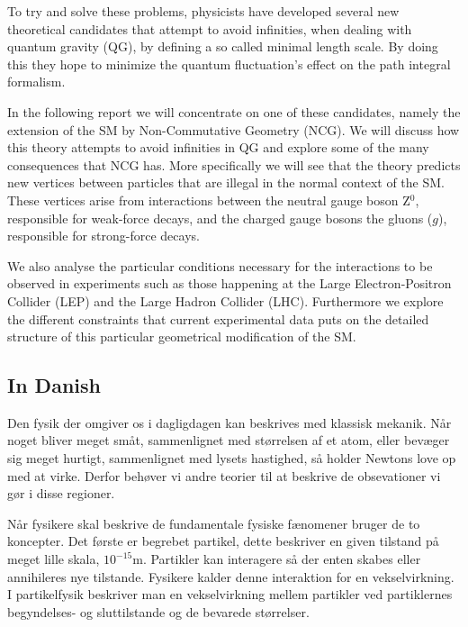 To try and solve these problems, physicists have developed several new theoretical candidates that attempt to avoid infinities, when dealing with quantum gravity (QG), by defining a so called minimal length scale. By doing this they hope to minimize the quantum fluctuation's effect on the path integral formalism.

In the following report we will concentrate on one of these candidates, namely the extension of the SM by Non-Commutative Geometry (NCG). We will discuss how this theory attempts to avoid infinities in QG and explore some of the many consequences that NCG has. More specifically we will see that the theory predicts new vertices between particles that are illegal in the normal context of the SM. These vertices arise from interactions between the neutral gauge boson Z$^0$, responsible for weak-force decays, and the charged gauge bosons the gluons ($g$), responsible for strong-force decays.

We also analyse the particular conditions necessary for the interactions to be observed in experiments such as those happening at the Large Electron-Positron Collider (LEP) and the Large Hadron Collider (LHC). Furthermore we explore the different constraints that current experimental data puts on the detailed structure of this particular geometrical modification of the SM.

\newpage
\subsection{In Danish}
Den fysik der omgiver os i dagligdagen kan beskrives med klassisk mekanik. Når noget bliver meget småt, sammenlignet med størrelsen af et atom, eller bevæger sig meget hurtigt, sammenlignet med lysets hastighed, så holder Newtons love op med at virke. Derfor behøver vi andre teorier til at beskrive de obsevationer vi gør i disse regioner.

Når fysikere skal beskrive de fundamentale fysiske fænomener bruger de to koncepter. Det første er begrebet partikel, dette beskriver en given tilstand på meget lille skala, $10^{-15}$m. Partikler kan interagere så der enten skabes eller annihileres nye tilstande. Fysikere kalder denne interaktion for en vekselvirkning. I partikelfysik beskriver man en vekselvirkning mellem partikler ved partiklernes begyndelses- og sluttilstande og de bevarede størrelser.

